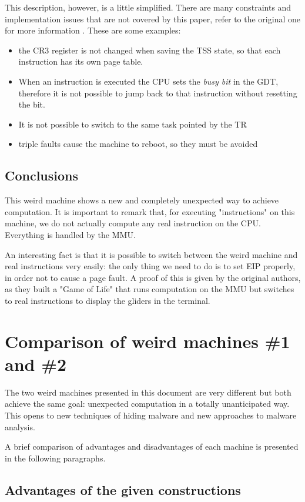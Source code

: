 \documentclass[11pt,twoside,a4paper]{article}
\begin{document}
This description, however, is a little simplified. There are many constraints and implementation issues that are not covered by this paper, refer to the original one for more information \cite{mmu_machine}. These are some examples:
\begin{itemize}
\item the CR3 register is not changed when saving the TSS state, so that each instruction has its own page table.
\item When an instruction is executed the CPU sets the \emph{busy bit} in the GDT, therefore it is not possible to jump back to that instruction without resetting the bit.
\item It is not possible to switch to the same task pointed by the TR
\item triple faults cause the machine to reboot, so they must be avoided
\end{itemize}


\subsection{Conclusions}
This weird machine shows a new and completely unexpected way to achieve computation.
It is important to remark that, for executing "instructions" on this machine, we do not actually compute any real instruction on the CPU. Everything is handled by the MMU. 

An interesting fact is that it is possible to switch between the weird machine and real instructions very easily: the only thing we need to do is to set EIP properly, in order not to cause a page fault. A proof of this is given by the original authors, as they built a "Game of Life" that runs computation on the MMU but switches to real instructions to display the gliders in the terminal.


\section{Comparison of weird machines \#1 and \#2}

The two weird machines presented in this document are very different but both achieve the same goal: unexpected computation in a totally unanticipated way. This opens to new techniques of hiding malware and new approaches to malware analysis.

A brief comparison of advantages and disadvantages of each machine is presented in the following paragraphs.

\subsection{Advantages of the given constructions}
\end{document}
